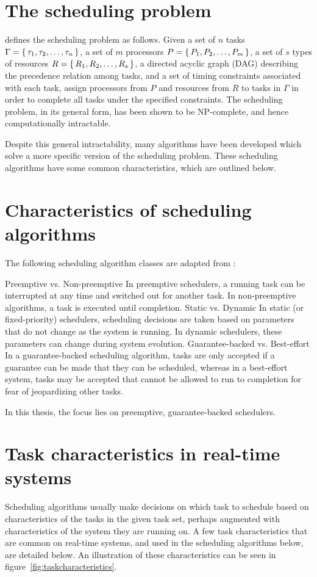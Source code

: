\documentclass[twoside]{uva-inf-bachelor-thesis}
\begin{document}
\section{The scheduling problem}
\textcite{buttazzo2011hard} defines the scheduling problem as follows. Given a set of $n$ tasks $\Gamma = \set{\tau_1, \tau_2, \ldots, \tau_n}$, a set of $m$ processors $P = \set{P_1, P_2, \ldots, P_m}$, a set of $s$ types of resources $R = \set{R_1, R_2, \ldots, R_s}$, a directed acyclic graph (DAG) describing the precedence relation among tasks, and a set of timing constraints associated with each task, assign processors from $P$ and resources from $R$ to tasks in $\Gamma$ in order to complete all tasks under the specified constraints. The scheduling problem, in its general form, has been shown to be NP-complete, and hence computationally intractable.

Despite this general intractability, many algorithms have been developed which solve a more specific version of the scheduling problem. These scheduling algorithms have some common characteristics, which are outlined below.

\section{Characteristics of scheduling algorithms}
The following scheduling algorithm classes are adapted from \textcite{buttazzo2011hard}:
\begin{outline}
    \1 Preemptive vs. Non-preemptive
        \2 In preemptive schedulers, a running task can be interrupted at any time and switched out for another task.
        \2 In non-preemptive algorithms, a task is executed until completion.
    \1 Static vs. Dynamic
        \2 In static (or fixed-priority) schedulers, scheduling decisions are taken based on parameters that do not change as the system is running. In dynamic schedulers, these parameters can change during system evolution.
    \1 Guarantee-backed vs. Best-effort
        \2 In a guarantee-backed scheduling algorithm, tasks are only accepted if a guarantee can be made that they can be scheduled, whereas in a best-effort system, tasks may be accepted that cannot be allowed to run to completion for fear of jeopardizing other tasks.
\end{outline}

\noindent In this thesis, the focus lies on preemptive, guarantee-backed schedulers.

\section{Task characteristics in real-time systems}
Scheduling algorithms usually make decisions on which task to schedule based on characteristics of the tasks in the given task set, perhaps augmented with characteristics of the system they are running on. A few task characteristics that are common on real-time systems, and used in the scheduling algorithms below, are detailed below. An illustration of these characteristics can be seen in figure~\ref{fig:taskcharacteristics}.
\end{document}
